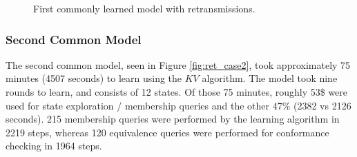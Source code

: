 \begin{figure}[ht]
	\vspace*{\fill}
	\noindent
	\hspace*{-2.1\oddsidemargin}%
	\caption{First commonly learned model with retransmissions.}
	\label{fig:ret_case1}
	\vspace*{\fill}
\end{figure}

\newpage

\subsubsection*{Second Common Model}

The second common model, seen in Figure \ref{fig:ret_case2}, took approximately 75 minutes (4507 seconds) to learn using the $KV$ algorithm. The model took nine rounds to learn, and consists of 12 states. Of those 75 minutes, roughly 53\$ were used for state exploration / membership queries and the other 47\% (2382 vs 2126 seconds). 215 membership queries were performed by the learning algorithm in 2219 steps, whereas 120 equivalence queries were performed for conformance checking in 1964 steps. 

